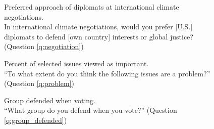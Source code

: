 \begin{figure}[h!]
    \caption[Preferred approach for international climate negotiations]{Preferred approach of diplomats at international climate negotiations. \\ In international climate negotiations, would you prefer [U.S.] diplomats to defend [own country] interests or global justice? (Question \ref{q:negotiation})}\label{fig:negotiation}
\end{figure}

\begin{figure}[h!]
    \caption[Importance of selected issues]{Percent of selected issues viewed as important.\\ ``To what extent do you think the following issues are a problem?'' (Question \ref{q:problem})}\label{fig:problem}
\end{figure}

\begin{figure}[h!]
    \caption[Group defended when voting]{Group defended when voting. \\ ``What group do you defend when you vote?'' (Question \ref{q:group_defended})}\label{fig:group_defended}
\end{figure}

